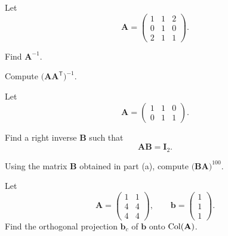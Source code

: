 \documentclass[11pt,oneside]{article}
\begin{document}
\begin{problem}
Let
\[
\mathbf A=
\begin{pmatrix}
1&1&2\\
0&1&0\\
2&1&1
\end{pmatrix}.
\]
\begin{problemsubparts}
\item Find $\mathbf A^{-1}$.
\item Compute $\bigl(\mathbf A\mathbf A^{\mathsf T}\bigr)^{-1}$.
\end{problemsubparts}
\end{problem}

\begin{problem}
Let
\[
\mathbf A=
\begin{pmatrix}
1&1&0\\
0&1&1
\end{pmatrix}.
\]
\begin{problemsubparts}
\item Find a right inverse $\mathbf B$ such that
\[
\mathbf A\mathbf B=\mathbf I_2.
\]
\item Using the matrix $\mathbf B$ obtained in part \textup{(a)}, compute $\bigl(\mathbf B\mathbf A\bigr)^{100}$.
\end{problemsubparts}
\end{problem}

\begin{problem}
Let
\[
\mathbf A=
\begin{pmatrix}
1&1\\
4&4\\
4&4
\end{pmatrix},
\qquad
\mathbf b=
\begin{pmatrix}
1\\1\\1
\end{pmatrix}.
\]
Find the orthogonal projection $\mathbf b_c$ of $\mathbf b$ onto $\operatorname{Col}(\mathbf A)$.
\end{problem}
\end{document}

